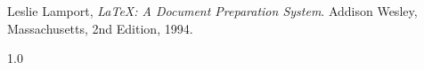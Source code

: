 \documentclass[fontsize=13pt, %
    paper=a4, %
    twoside, %
    captions=tableheading,
    index=totoc,
    hyperref]{labbook}
\begin{document}
\begin{spacing}{1.0}
\begin{addmargin}[4cm]{0cm}
\end{addmargin}


\begin{thebibliography}{9}

Leslie Lamport,
\emph{\LaTeX: A Document Preparation System}.
Addison Wesley, Massachusetts,
2nd Edition,
1994.

\end{thebibliography}


\end{spacing}{1.0}
\end{document}

